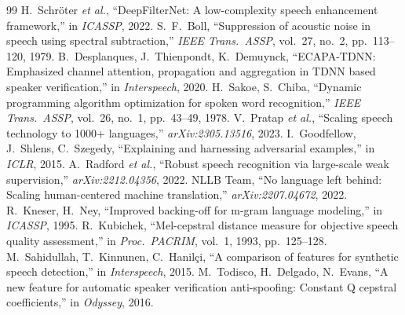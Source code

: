 \documentclass[conference]{IEEEtran}
\begin{document}
\begin{thebibliography}{99}
 H.~Schröter \emph{et al.}, ``DeepFilterNet: A
low-complexity speech enhancement framework,'' in \textit{ICASSP}, 2022.
 S.~F.~Boll, ``Suppression of acoustic noise in speech
using spectral subtraction,'' \textit{IEEE Trans.\ ASSP}, vol.\ 27, no.\ 2,
pp.\ 113--120, 1979.
 B.~Desplanques, J.~Thienpondt, K.~Demuynck,
``ECAPA-TDNN: Emphasized channel attention, propagation and aggregation in
TDNN based speaker verification,'' in \textit{Interspeech}, 2020.
 H.~Sakoe, S.~Chiba, ``Dynamic programming algorithm
optimization for spoken word recognition,'' \textit{IEEE Trans.\ ASSP},
vol.\ 26, no.\ 1, pp.\ 43--49, 1978.
 V.~Pratap \emph{et al.}, ``Scaling speech technology
to 1000+ languages,'' \textit{arXiv:2305.13516}, 2023.
 I.~Goodfellow, J.~Shlens, C.~Szegedy, ``Explaining and
harnessing adversarial examples,'' in \textit{ICLR}, 2015.
 A.~Radford \emph{et al.}, ``Robust speech recognition via
large-scale weak supervision,'' \textit{arXiv:2212.04356}, 2022.
 NLLB Team, ``No language left behind: Scaling human-centered
machine translation,'' \textit{arXiv:2207.04672}, 2022.
 R.~Kneser, H.~Ney, ``Improved backing-off for m-gram
language modeling,'' in \textit{ICASSP}, 1995.
 R.~Kubichek, ``Mel-cepstral distance measure for
objective speech quality assessment,'' in \textit{Proc.\ PACRIM},
vol.\ 1, 1993, pp.\ 125--128.
 M.~Sahidullah, T.~Kinnunen, C.~Hanilçi, ``A comparison of
features for synthetic speech detection,'' in \textit{Interspeech}, 2015.
 M.~Todisco, H.~Delgado, N.~Evans, ``A new feature for
automatic speaker verification anti-spoofing: Constant Q cepstral
coefficients,'' in \textit{Odyssey}, 2016.
\end{thebibliography}
\end{document}
